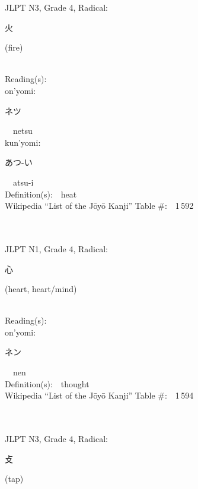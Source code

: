 \begin{multicols}{2}
{JLPT N3, Grade 4, Radical:\ \ {\begin{CJK}{UTF8}{min} 火 \end{CJK}} (fire) } \\
Reading(s):\ \ \\
{\hspace*{1em}}on'yomi:\ \ \\
{\hspace*{2em}}{\begin{CJK}{UTF8}{min} ネツ \end{CJK}}\ \ netsu\ \ \\
{\hspace*{1em}}kun'yomi:\ \ \\
{\hspace*{2em}}{\begin{CJK}{UTF8}{min} あつ-い \end{CJK}}\ \ atsu-i\ \ \\
Definition(s):\ \ heat \\
Wikipedia ``List of the J\=oy\=o Kanji'' Table \#:\ \ 1\,592 \\
\ \ \\
{\fontsize{34pt}{40pt}  }\ \ \\  %
{JLPT N1, Grade 4, Radical:\ \ {\begin{CJK}{UTF8}{min} 心 \end{CJK}} (heart, heart/mind) } \\
Reading(s):\ \ \\
{\hspace*{1em}}on'yomi:\ \ \\
{\hspace*{2em}}{\begin{CJK}{UTF8}{min} ネン \end{CJK}}\ \ nen\ \ \\
Definition(s):\ \ thought \\
Wikipedia ``List of the J\=oy\=o Kanji'' Table \#:\ \ 1\,594 \\
\ \ \\
{\fontsize{34pt}{40pt}  }\ \ \\  %
{JLPT N3, Grade 4, Radical:\ \ {\begin{CJK}{UTF8}{min} 攴 \end{CJK}} (tap) } \\

\end{multicols}
